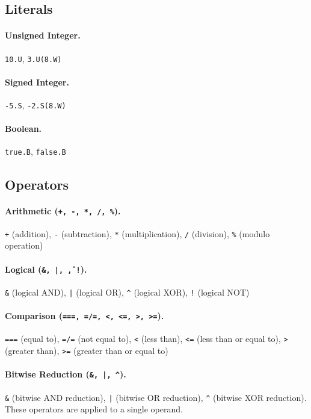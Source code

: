 \subsection{Literals} 
\paragraph{Unsigned Integer.}  \texttt{10.U}, \texttt{3.U(8.W)}

\paragraph{Signed Integer.} \texttt{-5.S}, \texttt{-2.S(8.W)}

\paragraph{Boolean.} \texttt{true.B}, \texttt{false.B}

\subsection{Operators} 
\paragraph{Arithmetic (\texttt{+, -, *, /, \%}).} \texttt{+} (addition), \texttt{-} (subtraction), \texttt{*} (multiplication), \texttt{/} (division), \texttt{\%} (modulo operation)

\paragraph{Logical (\texttt{\&, |, \^, !}).} \texttt{\&} (logical AND), \texttt{|} (logical OR), \texttt{\^{}} (logical XOR), \texttt{!} (logical NOT)

\paragraph{Comparison (\texttt{===, =/=, <, <=, >, >=}).} \texttt{===} (equal to), \texttt{=/=} (not equal to), \texttt{<} (less than), \texttt{<=} (less than or equal to), \texttt{>} (greater than), \texttt{>=} (greater than or equal to)

\paragraph{Bitwise Reduction (\texttt{\&, |, \^}).} \texttt{\&} (bitwise AND reduction), \texttt{|} (bitwise OR reduction), \texttt{\^{}} (bitwise XOR reduction). These operators are applied to a single operand.

